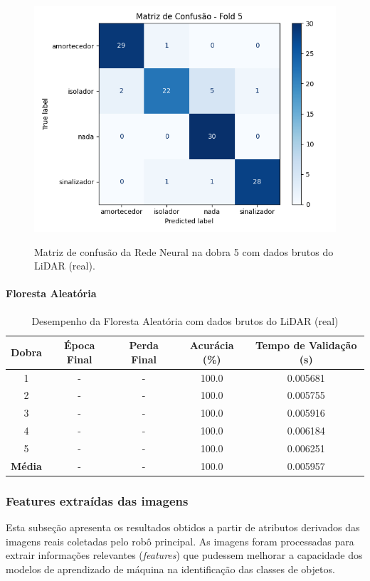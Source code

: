 \begin{figure}[H]
\caption{Matriz de confusão da Rede Neural na dobra 5 com dados brutos do LiDAR (real).}
\centering
\includegraphics[width=0.7\linewidth]{figuras/Resultados/real_principal_Teste2_nn.png}
\fonte{}
\label{fig:matriz_confusao_nn_lidar_bruto_real}
\end{figure}

\paragraph{Floresta Aleatória}

\begin{table}[H]
\centering
\caption{Desempenho da Floresta Aleatória com dados brutos do LiDAR (real)}
\label{tab:rf_lidar_bruto_real}
\begin{tabular}{ccccc}
\hline
\textbf{Dobra} & \textbf{Época Final} & \textbf{Perda Final} & \textbf{Acurácia (\%)} & \textbf{Tempo de Validação (s)} \\
\hline
1 & - & - & 100.0 & 0.005681 \\
2 & - & - & 100.0 & 0.005755 \\
3 & - & - & 100.0 & 0.005916 \\
4 & - & - & 100.0 & 0.006184 \\
5 & - & - & 100.0 & 0.006251 \\
\hline
\textbf{Média} & - & - & 100.0 & 0.005957 \\
\hline
\end{tabular}
\fonte{}
\end{table}

\subsubsection{Features extraídas das imagens}

Esta subseção apresenta os resultados obtidos a partir de atributos derivados das imagens reais coletadas pelo robô principal. As imagens foram processadas para extrair informações relevantes (\textit{features}) que pudessem melhorar a capacidade dos modelos de aprendizado de máquina na identificação das classes de objetos.

